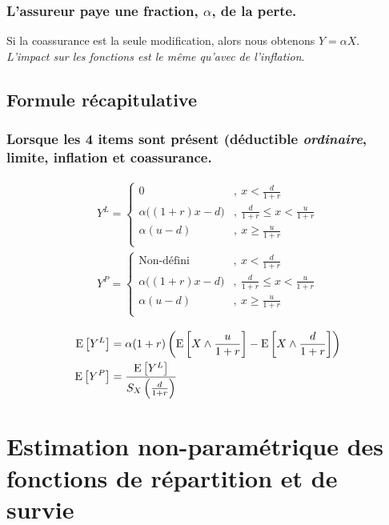 \documentclass[french, landscape]{article}
\begin{document}
\begin{multicols*}{3}
\subsubsection*{L'assureur paye une fraction, $\alpha$, de la perte.}

Si la coassurance est la seule modification, alors nous obtenons $Y = \alpha X$. \\
\textit{L'impact sur les fonctions est le même qu'avec de l'inflation}.

\subsection*{Formule récapitulative}
\subsubsection*{Lorsque les 4 items sont présent (déductible \textit{ordinaire}, limite, inflation et coassurance.}

\begin{align*}
Y^L = 
\begin{cases}
0		& ,\ x  < \frac{d}{1+r} \\
\alpha \Big( (1+r) x - d \Big)	& ,\ \frac{d}{1+r} \leq x < \frac{u}{1+r} \\
\alpha (u-d)		& ,\ x \geq \frac{u}{1+r} \\
\end{cases}\\
Y^P = 
\begin{cases}
\text{Non-défini}		& ,\ x  < \frac{d}{1+r} \\
\alpha \Big( (1+r) x - d \Big)	& ,\ \frac{d}{1+r} \leq x < \frac{u}{1+r} \\
\alpha (u-d)		& ,\ x \geq \frac{u}{1+r} \\
\end{cases}
\end{align*}

\begin{align*}
\mathrm{E} \left[ Y^L \right] &= \alpha (1+r) \left( \mathrm{E} \left[ X \wedge \frac{u}{1+r} \right] - \mathrm{E} \left[ X \wedge \frac{d}{1+r} \right]   \right) \\
\mathrm{E} \left[ Y^P \right] &= \frac{\mathrm{E} \left[ Y^L \right]}{S_X \left( \frac{d}{1+r} \right)}
\end{align*}

\setcounter{section}{13}
\section{Estimation non-paramétrique des fonctions de répartition et de survie}


\end{multicols*}
\end{document}
